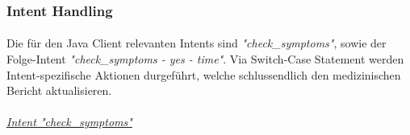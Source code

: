 \documentclass[11pt,a4paper]{article}
\begin{document}
		\subsubsection{Intent Handling} \label{sssec:intent_handling}
			\paragraph{}
				Die für den Java Client relevanten Intents sind \emph{"check\_symptoms"}, sowie der Folge-Intent 
				\emph{"check\_symptoms - yes - time"}. Via Switch-Case Statement werden Intent-spezifische Aktionen durgeführt,
				welche schlussendlich den medizinischen Bericht aktualisieren. \\\\
		
				\underline{\emph{Intent "check\_symptoms"}} \\
\end{document}
